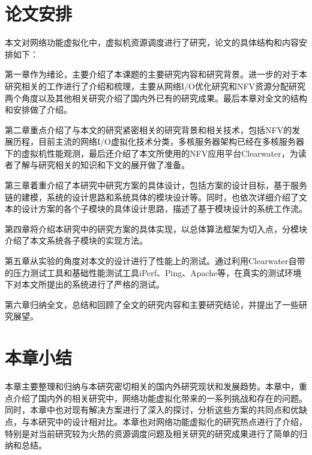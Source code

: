 \section{论文安排}
本文对网络功能虚拟化中，虚拟机资源调度进行了研究，论文的具体结构和内容安排如下：

第一章作为绪论，主要介绍了本课题的主要研究内容和研究背景。进一步的对于本研究相关的工作进行了介绍和梳理，主要从网络I/O优化研究和NFV资源分配研究两个角度以及其他相关研究介绍了国内外已有的研究成果。最后本章对全文的结构和安排做了介绍。

第二章重点介绍了与本文的研究紧密相关的研究背景和相关技术，包括NFV的发展历程，目前主流的网络I/O虚拟化技术分类，多核服务器架构已经在多核服务器下的虚拟机性能观测，最后还介绍了本文所使用的NFV应用平台Clearwater，为读者了解与研究相关的知识和下文的展开做了准备。

第三章着重介绍了本研究中研究方案的具体设计，包括方案的设计目标，基于服务链的建模，系统的设计思路和系统具体的模块设计等。同时，也依次详细介绍了文本的设计方案的各个子模块的具体设计思路，描述了基于模块设计的系统工作流。

第四章将介绍本研究中的研究方案的具体实现，以总体算法框架为切入点，分模块介绍了本文系统各子模块的实现方法。

第五章从实验的角度对本文的设计进行了性能上的测试。通过利用Clearwater自带的压力测试工具和基础性能测试工具iPerf、Ping、Apache等，在真实的测试环境下对本文所提出的系统进行了严格的测试。

第六章归纳全文，总结和回顾了全文的研究内容和主要研究结论，并提出了一些研究展望。

\section{本章小结}
本章主要整理和归纳与本研究密切相关的国内外研究现状和发展趋势。本章中，重点介绍了国内外的相关研究中，网络功能虚拟化带来的一系列挑战和存在的问题。同时，本章中也对现有解决方案进行了深入的探讨，分析这些方案的共同点和优缺点，与本研究中的设计相对比。本章也对网络功能虚拟化的研究热点进行了介绍，特别是对当前研究较为火热的资源调度问题及相关研究的研究成果进行了简单的归纳和总结。